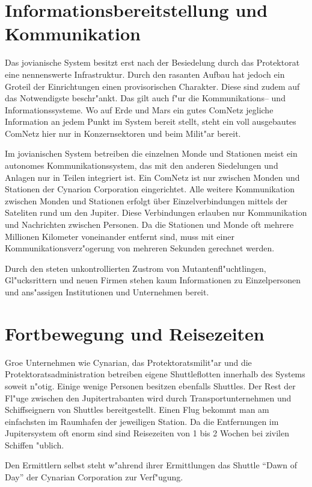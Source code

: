 \section{Informationsbereitstellung und Kommunikation}

Das jovianische System besitzt erst nach der Besiedelung durch das Protektorat eine nennenswerte Infrastruktur. Durch den rasanten Aufbau hat jedoch ein Gro\3teil der Einrichtungen einen provisorischen Charakter. Diese sind zudem auf das Notwendigste beschr"ankt. Das gilt auch f"ur die Kommunikations-- und Informationssysteme. Wo auf Erde und Mars ein gutes ComNetz jegliche Information an jedem Punkt im System bereit stellt, steht ein voll ausgebautes ComNetz hier nur in Konzernsektoren und beim Milit"ar bereit.

Im jovianischen System  betreiben die einzelnen Monde und Stationen meist ein autonomes Kommunikationssystem, das mit den anderen Siedelungen und Anlagen nur in Teilen integriert ist. Ein ComNetz ist nur zwischen Monden und Stationen der Cynarion Corporation eingerichtet. Alle weitere Kommunikation zwischen Monden und Stationen erfolgt über Einzelverbindungen mittels der Sateliten rund um den Jupiter. Diese Verbindungen erlauben nur Kommunikation und Nachrichten zwischen Personen. Da die Stationen und Monde oft mehrere Millionen Kilometer voneinander entfernt sind, muss mit einer Kommunikationsverz"ogerung von mehreren Sekunden gerechnet werden.

Durch den steten unkontrollierten Zustrom von Mutantenfl"uchtlingen, Gl"ucksrittern und neuen Firmen stehen kaum Informationen zu Einzelpersonen und ans"assigen Institutionen und Unternehmen bereit.

\section{Fortbewegung und Reisezeiten}

Gro\3e Unternehmen wie Cynarian, das Protektoratsmilit"ar und die Protektoratsadministration betreiben eigene Shuttleflotten innerhalb des Systems soweit n"otig. Einige wenige Personen besitzen ebenfalls Shuttles. Der Rest der Fl"uge zwischen den Jupitertrabanten wird durch Transportunternehmen und Schiffseignern von Shuttles bereitgestellt. Einen Flug bekommt man am einfachsten im Raumhafen der jeweiligen Station. Da die Entfernungen im Jupitersystem oft enorm sind sind Reisezeiten von 1 bis 2 Wochen bei zivilen Schiffen "ublich.

Den Ermittlern selbst steht w"ahrend ihrer Ermittlungen das Shuttle "`Dawn of Day"' der Cynarian Corporation zur Verf"ugung.

